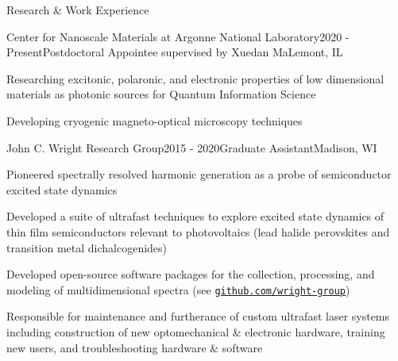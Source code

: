 \documentclass{resume} %
\begin{document}
\begin{rSection}{Research \& Work Experience}
	
\begin{rSubsection}{Center for Nanoscale Materials at Argonne National Laboratory}{2020 - Present}{Postdoctoral Appointee supervised by Xuedan Ma}{Lemont, IL}
	\item Researching excitonic, polaronic, and electronic properties of low dimensional materials as photonic sources for Quantum Information Science
	\item Developing cryogenic magneto-optical microscopy techniques 	
\end{rSubsection}

\begin{rSubsection}{John C. Wright Research Group}{2015 - 2020}{Graduate Assistant}{Madison, WI}
\item Pioneered spectrally resolved harmonic generation as a probe of semiconductor excited state dynamics
\item Developed a suite of ultrafast techniques to explore excited state dynamics of thin film semiconductors relevant to photovoltaics (lead halide perovskites and transition metal dichalcogenides)%
\item Developed open-source software packages for the  collection, processing, and modeling of multidimensional spectra (see \href{http://github.com/wright-group}{\texttt{github.com/wright-group}})
\item Responsible for maintenance and furtherance of custom ultrafast laser systems including construction of new optomechanical \& electronic hardware, training new users, and troubleshooting hardware \& software

\end{rSubsection}


\end{rSection}
\end{document}
